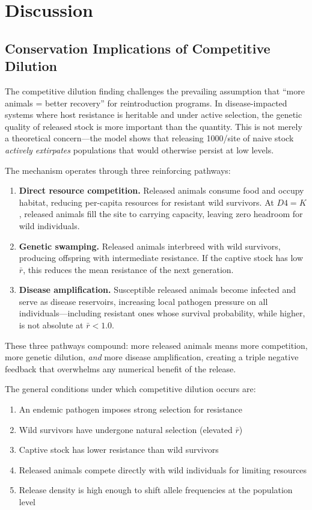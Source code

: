\documentclass[11pt,a4paper]{article}
\newcommand{\rbar}{\ensuremath{\bar{r}}}
\begin{document}
\section{Discussion}

\subsection{Conservation Implications of Competitive Dilution}

The competitive dilution finding challenges the prevailing assumption that ``more animals = better recovery'' for reintroduction programs. In disease-impacted systems where host resistance is heritable and under active selection, the genetic quality of released stock is more important than the quantity. This is not merely a theoretical concern---the model shows that releasing 1000/site of naive stock \emph{actively extirpates} populations that would otherwise persist at low levels.

The mechanism operates through three reinforcing pathways:

\begin{enumerate}[nosep]
  \item \textbf{Direct resource competition.} Released animals consume food and occupy habitat, reducing per-capita resources for resistant wild survivors. At $D4 = K$, released animals fill the site to carrying capacity, leaving zero headroom for wild individuals.
  \item \textbf{Genetic swamping.} Released animals interbreed with wild survivors, producing offspring with intermediate resistance. If the captive stock has low $\rbar$, this reduces the mean resistance of the next generation.
  \item \textbf{Disease amplification.} Susceptible released animals become infected and serve as disease reservoirs, increasing local pathogen pressure on all individuals---including resistant ones whose survival probability, while higher, is not absolute at $\rbar < 1.0$.
\end{enumerate}

These three pathways compound: more released animals means more competition, more genetic dilution, \emph{and} more disease amplification, creating a triple negative feedback that overwhelms any numerical benefit of the release.

The general conditions under which competitive dilution occurs are:
\begin{enumerate}[nosep]
  \item An endemic pathogen imposes strong selection for resistance
  \item Wild survivors have undergone natural selection (elevated $\rbar$)
  \item Captive stock has lower resistance than wild survivors
  \item Released animals compete directly with wild individuals for limiting resources
  \item Release density is high enough to shift allele frequencies at the population level
\end{enumerate}
\end{document}
